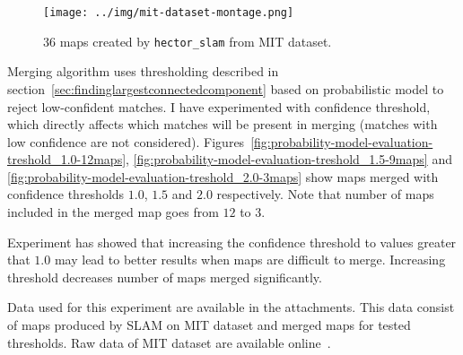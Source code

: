 \begin{figure}
    \centering
    \texttt{[image: ../img/mit-dataset-montage.png]}
    \caption{$36$ maps created by \texttt{hector\_slam} from \gls{MIT} dataset.}
    \label{fig:probability-model-evaluation-montage}
\end{figure}

Merging algorithm uses thresholding described in section~\ref{sec:findinglargestconnectedcomponent} based on probabilistic model to reject low-confident matches. I have experimented with confidence threshold, which directly affects which matches will be present in merging (matches with low confidence are not considered). Figures~\ref{fig:probability-model-evaluation-treshold_1.0-12maps}, \ref{fig:probability-model-evaluation-treshold_1.5-9maps} and \ref{fig:probability-model-evaluation-treshold_2.0-3maps} show maps merged with confidence thresholds $1.0$, $1.5$ and $2.0$ respectively. Note that number of maps included in the merged map goes from $12$ to $3$.

Experiment has showed that increasing the confidence threshold to values greater that $1.0$ may lead to better results when maps are difficult to merge. Increasing threshold decreases number of maps merged significantly.

Data used for this experiment are available in the attachments. This data consist of maps produced by \gls{SLAM} on \gls{MIT} dataset and merged maps for tested thresholds. Raw data of \gls{MIT} dataset are available online~\cite{Fallon2013}.

